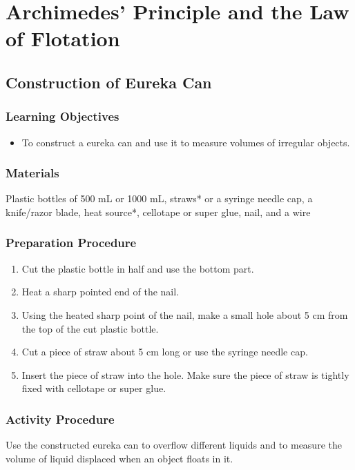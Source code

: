 \section{Archimedes' Principle and the Law of Flotation}




\subsection{Construction of Eureka Can}

\subsubsection*{Learning Objectives}
\begin{itemize}
\item{To construct a eureka can and use it to measure volumes of irregular objects.} 
\end{itemize}

\subsubsection*{Materials}
Plastic bottles of 500 mL or 1000 mL, straws* or a syringe needle cap, a knife/razor blade, heat source*, cellotape or super glue, nail, and a wire

\subsubsection*{Preparation Procedure}
\begin{enumerate}
\item{Cut the plastic bottle in half and use the bottom part.} 
\item{Heat a sharp pointed end of the nail.} 
\item{Using the heated sharp point of the nail, make a small hole about 5 cm from the top of the cut plastic bottle.} 
\item{Cut a piece of straw about 5 cm long or use the syringe needle cap.} 
\item{Insert the piece of straw into the hole. Make sure the piece of straw is tightly fixed with cellotape or super glue.} 
\end{enumerate}

\subsubsection*{Activity Procedure}
Use the constructed eureka can to overflow different liquids and to measure the volume of liquid displaced when an object floats in it.

